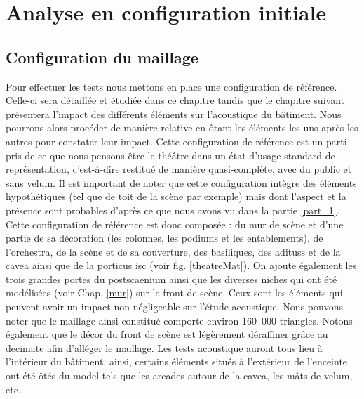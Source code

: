 	
\chapter{Analyse en configuration initiale}
	\minitoc
	\newpage
	

	\section{Configuration du maillage}
Pour effectuer les tests nous mettons en place une configuration de référence. Celle-ci sera détaillée et étudiée dans ce chapitre tandis que le chapitre suivant présentera l'impact des différents éléments sur l'acoustique du bâtiment. Nous pourrons alors procéder de manière relative en ôtant les éléments les uns après les autres pour constater leur impact. Cette configuration de référence est un parti pris de ce que nous pensons être le théâtre dans un état d'usage standard de représentation, c'est-à-dire restitué de manière quasi-complète, avec du public et sans \gls{velum}. Il est important de noter que cette configuration intègre des éléments hypothétiques (tel que de toit de la scène par exemple) mais dont l'aspect et la présence sont probables d'après ce que nous avons vu dans la partie \ref{part_1}. Cette configuration de référence est donc composée : du mur de scène et d'une partie de sa décoration (les colonnes, les \glspl{podium} et les entablements), de l'\gls{orchestra}, de la scène et de sa couverture, des basiliques, des \glspl{aditus} et de la \gls{cavea} ainsi que de la \gls{porticus isc} (voir fig. \ref{theatreMat}). On ajoute également les trois grandes portes du \gls{postscaenium} ainsi que les diverses niches qui ont été modélisées (voir Chap. \ref{mur}) sur le front de scène. Ceux sont les éléments qui peuvent avoir un impact non négligeable sur l'étude acoustique. Nous pouvons noter que le maillage ainsi constitué comporte environ 160~000 triangles. Notons également que le décor du front de scène est légèrement déraffiner grâce au \gls{decimate} afin d'alléger le maillage. Les tests acoustique auront tous lieu à l'intérieur du bâtiment, ainsi, certains éléments situés à l'extérieur de l'enceinte ont été ôtés du model tels que les arcades autour de la \gls{cavea}, les mâts de \gls{velum}, etc. 

